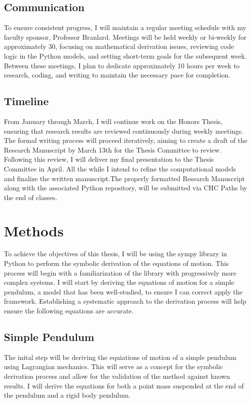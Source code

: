 \documentclass[onecolumn,draftcls]{IEEEtran}
\begin{document}
\subsection*{Communication}
To ensure consistent progress, I will maintain a regular meeting schedule with my faculty sponsor, Professor Branlard. Meetings will be held weekly or bi-weekly for approximately 30, focusing on mathematical derivation issues, reviewing code logic in the Python models, and setting short-term goals for the subsequent week. Between these meetings, I plan to dedicate approximately 10 hours per week to research, coding, and writing to maintain the necessary pace for completion.

\subsection*{Timeline}
From January through March, I will continue work on the Honors Thesis, ensuring that research results are reviewed continuously during weekly meetings. The formal writing process will proceed iteratively, aiming to create a draft of the Research Manuscript by March 13th for the Thesis Committee to review. Following this review, I will deliver my final presentation to the Thesis Committee in April. All the while I intend to refine the computational models and finalize the written manuscript.The properly formatted Research Manuscript along with the associated Python repository, will be submitted via CHC Paths by the end of classes.

\section{Methods}
To achieve the objectives of this thesis, I will be using the sympy library in Python to perform the symbolic derivation of the equations of motion. This process will begin with a familiarization of the library with progressively more complex systems. I will start by deriving the equations of motion for a simple pendulum, a model that has been well-studied, to ensure I can correct apply the framework. Establishing a systematic approach to the derivation process will help ensure the following equations are accurate.

\subsection*{Simple Pendulum}
The inital step will be deriving the equiations of motion of a simple pendulum using Lagrangian mechanics. This will serve as a concept for the symbolic derivation process and allow for the validation of the method against known results. I will derive the equations for both a point mass suspended at the end of the pendulum and a rigid body pendulum.
\end{document}
